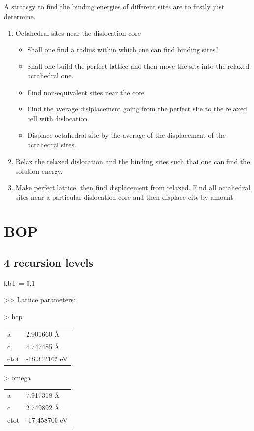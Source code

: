 \documentclass[11pt]{article}
\begin{document}
A strategy to find the binding energies of different sites are to
firstly just determine. 

\begin{enumerate}
\item Octahedral sites near the dislocation core
\begin{itemize}
\item Shall one find a radius within which one can find binding
sites?
\item Shall one build the perfect lattice and then move the site
into the relaxed octahedral one.
\item Find non-equivalent sites near the core
\item Find the average dislplacement going from the perfect site to
the relaxed cell with dislocation
\item Displace octahedral site by the average of the displacement of
the octahedral sites.
\end{itemize}

\item Relax the relaxed dislocation and the binding sites such that one
can find the solution energy.

\item Make perfect lattice, then find displacement from relaxed. Find
all octahedral sites near a particular dislocation core and then
displace cite by amount
\end{enumerate}


\section{BOP}
\label{sec:orgbaeacd1}

\subsection{4 recursion levels}
\label{sec:org24bbffe}

kbT = 0.1

>> Lattice parameters:

> hcp
\begin{center}
\begin{tabular}{ll}
a & 2.901660  \AA{}\\
c & 4.747485  \AA{}\\
etot & -18.342162  eV\\
\end{tabular}
\end{center}

> omega
\begin{center}
\begin{tabular}{ll}
a & 7.917318  \AA{}\\
c & 2.749892 \AA{}\\
etot & -17.458700 eV\\
\end{tabular}
\end{center}
\end{document}
